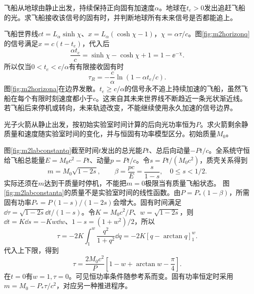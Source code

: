 \begin{exercise}\label{ex:m2horizon}
飞船从地球由静止出发，持续保持正向固有加速度$\alpha$。地球在$t_e>0$发出追赶飞船的光。求飞船接收该信号的固有时，并判断地球所有未来信号是否都能追上。
\end{exercise}
\begin{solution}
飞船世界线$ct=L_\alpha\sinh\chi$、$x=L_\alpha(\cosh\chi-1)$，$\chi=\alpha\tau/c$。图\ref{fig:m2horizonq}的信号满足$x=c(t-t_e)$，代入后
\[
 \frac{\alpha t_e}c=\sinh\chi-\cosh\chi+1=1-\ee^{-\chi}.
\]
所以仅当$0<t_e<c/\alpha$有有限接收固有时
\[
 \tau_R=-\frac c\alpha\ln(1-\alpha t_e/c).
\]
图\ref{fig:m2horizona}在边界发散。$t_e\geq c/\alpha$的信号永不追上持续加速的飞船，虽然飞船在每个有限时刻速度都小于$c$。这来自其未来世界线不断趋近一条光状渐近线。若飞船后来停机或转向，未来轨迹改变，不能继续使用永久加速的信号边界。
\end{solution}

\begin{exercise}\label{ex:m2labconstant}
光子火箭从静止出发，按初始实验室时间计算的后向光功率恒为$P$。求火箭剩余静质量和速度随实验室时间的变化，并与恒固有功率模型区分。初始质量$M_0$。
\end{exercise}
\begin{solution}
图\ref{fig:m2labconstantq}截至时间$t$发出的总光能$Pt$、总后向动量$-Pt/c$。全系统守恒给飞船总能量$E=M_0c^2-Pt$、动量$p=Pt/c$。令$s=Pt/(M_0c^2)$，质壳关系得到
\[
 m=M_0\sqrt{1-2s},\qquad \beta=\frac{pc}E=\frac s{1-s},\quad 0\leq s<1/2.
\]
实际还须在$m$达到干质量时停机，不能把$m=0$极限当有质量飞船状态。
图\ref{fig:m2labconstanta}的质量不是实验室时间的线性函数。由$P=P_*(1-\beta)$，所需固有功率$P_*=P(1-s)/(1-2s)$会增大。固有时间满足$\dd\tau=\sqrt{1-2s}\dd t/(1-s)$。令$K=M_0c^2/P$、$w=\sqrt{1-2s}$，则$\dd t=K\dd s=-Kw\dd w$、$1-s=(1+w^2)/2$，所以
\[
 \tau=-2K\int_1^w\frac{q^2}{1+q^2}\dd q
 =-2K[q-\arctan q]_1^w.
\]
代入上下限，得到
\[
 \tau=\frac{2M_0c^2}P\left[1-w+\arctan w-\frac\pi4\right].
\]
在$t=0$有$w=1,\tau=0$。可见恒功率条件随参考系而变。固有功率恒定时采用$m=M_0-P_*\tau/c^2$，对应另一种推进程序。
\end{solution}
